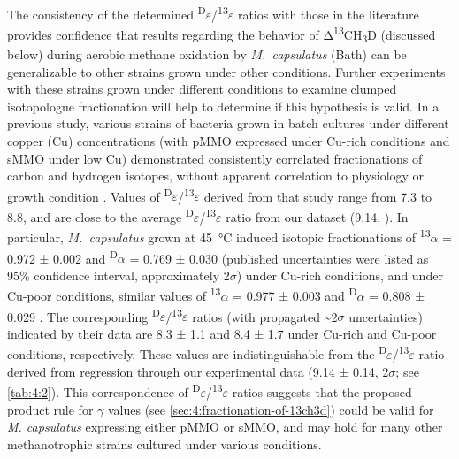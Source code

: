 The consistency of the determined
\textsuperscript{D}$\varepsilon$/\textsuperscript{13}$\varepsilon$ ratios with those in the
literature provides confidence that results regarding the behavior of
Δ\textsuperscript{13}CH\textsubscript{3}D (discussed below) during
aerobic methane oxidation by \emph{M.~capsulatus} (Bath) can be
generalizable to other strains grown under other conditions. Further
experiments with these strains grown under different conditions to
examine clumped isotopologue fractionation will help to determine if
this hypothesis is valid. In a previous study, various strains of
bacteria \parencite[including \emph{M.~capsulatus}, which has two pMMOs and one
sMMO;][]{Ward++_2004_PLOSBiol} grown in batch cultures under different
copper (Cu) concentrations (with pMMO expressed under Cu-rich conditions
and sMMO under low Cu) demonstrated consistently correlated
fractionations of carbon and hydrogen isotopes, without apparent
correlation to physiology or growth condition \parencite{Feisthauer++_2011_GCA}.
Values of \textsuperscript{D}$\varepsilon$/\textsuperscript{13}$\varepsilon$ derived from that
study range from 7.3 to 8.8, and are close to the average
\textsuperscript{D}$\varepsilon$/\textsuperscript{13}$\varepsilon$ ratio from our dataset (9.14, ). In particular, \emph{M.~cap\-su\-la\-tus} grown at 45~°C induced
isotopic fractionations of \textsuperscript{13}$\alpha$ = 0.972 ± 0.002 and
\textsuperscript{D}$\alpha$ = 0.769 ± 0.030 (published uncertainties were
listed as 95\% confidence interval, approximately 2$\sigma$) under Cu-rich
conditions, and under Cu-poor conditions, similar values of
\textsuperscript{13}$\alpha$ = 0.977 ± 0.003 and \textsuperscript{D}$\alpha$ = 0.808 ±
0.029 \parencite{Feisthauer++_2011_GCA}. The corresponding
\textsuperscript{D}$\varepsilon$/\textsuperscript{13}$\varepsilon$ ratios (with propagated
\textasciitilde{}2$\sigma$ uncertainties) indicated by their data are 8.3 ± 1.1
and 8.4 ± 1.7 under Cu-rich and Cu-poor conditions, respectively. These
values are indistinguishable from the
\textsuperscript{D}$\varepsilon$/\textsuperscript{13}$\varepsilon$ ratio derived from regression
through our experimental data (9.14 ± 0.14, 2$\sigma$; see \autoref{tab:4:2}). This
correspondence of \textsuperscript{D}$\varepsilon$/\textsuperscript{13}$\varepsilon$ ratios
suggests that the proposed product rule for $\gamma$ values (see \autoref{sec:4:fractionation-of-13ch3d})
could be valid for \emph{M. capsulatus} expressing either pMMO or sMMO,
and may hold for many other methanotrophic strains cultured under
various conditions.

